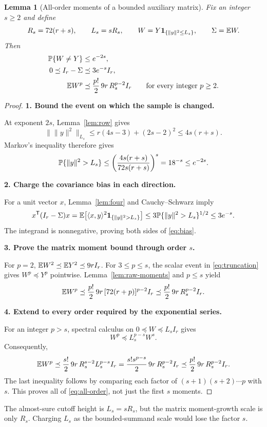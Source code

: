 \documentclass[11pt]{article}
\numberwithin{equation}{section}
\newtheorem{lemma}[theorem]{Lemma}
\theoremstyle{definition}\newtheorem{definition}[theorem]{Definition}
\theoremstyle{remark}\newtheorem{remark}[theorem]{Remark}
\newcommand{\norm}[1]{\lVert#1\rVert}\newcommand{\ip}[2]{\langle#1,#2\rangle}
\newcommand{\one}{\mathbf1}\newcommand{\F}{\mathrm F}
\newcommand{\step}[1]{\par\addvspace{.65\baselineskip}\Needspace{4\baselineskip}\noindent\textbf{#1}\par\nobreak\smallskip}
\begin{document}
\begin{lemma}[All-order moments of a bounded auxiliary matrix]\label{lem:truncate}
Fix an integer $s\ge2$ and define
\begin{equation}\label{eq:truncation}
 R_s=72(r+s),\qquad L_s=sR_s,\qquad
 W=Y\one_{\{\norm y^2\le L_s\}},\qquad\Sigma=\E W.
\end{equation}
Then
\begin{align}
 \mathbb P\{W\ne Y\}&\le e^{-2s},\label{eq:clip}\\
 0\preceq I_r-\Sigma&\preceq3e^{-s}I_r,\label{eq:bias}\\
 \mathbb E W^p&\preceq\frac{p!}{2}\,9r\,R_s^{p-2}I_r
 \qquad\text{for every integer }p\ge2.\label{eq:all-order}
\end{align}
\end{lemma}
\begin{proof}
\step{1. Bound the event on which the sample is changed.}
At exponent $2s$, Lemma~\ref{lem:row} gives
\[
 \bigl\|\norm y^2\bigr\|_{L_s}
 \le r(4s-3)+(2s-2)^2\le4s(r+s).
\]
Markov's inequality therefore gives
\[
 \Prob\{\norm y^2>L_s\}
 \le\left(\frac{4s(r+s)}{72s(r+s)}\right)^s
 =18^{-s}\le e^{-2s}.
\]

\step{2. Charge the covariance bias in each direction.}
For a unit vector $x$, Lemma~\ref{lem:four} and Cauchy--Schwarz imply
\[
 x^{\mathsf T}(I_r-\Sigma)x
 =\E\bigl[\ip{x}{y}^2\one_{\{\norm y^2>L_s\}}\bigr]
 \le3\Prob\{\norm y^2>L_s\}^{1/2}\le3e^{-s}.
\]
The integrand is nonnegative, proving both sides of \eqref{eq:bias}.

\step{3. Prove the matrix moment bound through order $s$.}
For $p=2$, $\mathbb E W^2\preceq\mathbb E Y^2\preceq9rI_r$.
For $3\le p\le s$, the scalar event in \eqref{eq:truncation} gives
$W^p\preceq Y^p$ pointwise. Lemma~\ref{lem:raw-moments} and $p\le s$ yield
\[
 \mathbb E W^p\preceq\frac{p!}{2}\,9r\,[72(r+p)]^{p-2}I_r
 \preceq\frac{p!}{2}\,9r\,R_s^{p-2}I_r.
\]

\step{4. Extend to every order required by the exponential series.}
For an integer $p>s$, spectral calculus on $0\preceq W\preceq L_sI_r$ gives
\[
 W^p\preceq L_s^{p-s}W^s.
\]
Consequently,
\[
 \mathbb E W^p\preceq\frac{s!}{2}\,9r\,R_s^{s-2}L_s^{p-s}I_r
 =\frac{s!s^{p-s}}{2}\,9r\,R_s^{p-2}I_r
 \preceq\frac{p!}{2}\,9r\,R_s^{p-2}I_r.
\]
The last inequality follows by comparing each factor of
$(s+1)(s+2)\cdots p$ with $s$. This proves all of \eqref{eq:all-order},
not just the first $s$ moments.
\end{proof}
\begin{takeaway}
The almost-sure cutoff height is $L_s=sR_s$, but the matrix moment-growth scale is
only $R_s$. Charging $L_s$ as the bounded-summand scale would lose the factor $s$.
\end{takeaway}
\end{document}
